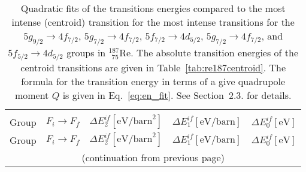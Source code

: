 \begin{longtable}{cc|rrr}
\caption{\label{tab:re187energ}%
Quadratic fits of the transitions energies compared to the most intense (centroid) transition for the most intense transitions for the $5g_{9/2}\rightarrow4f_{7/2}$, $5g_{7/2}\rightarrow4f_{7/2}$, $5f_{7/2}\rightarrow4d_{5/2}$, $5g_{7/2}\rightarrow4f_{7/2}$, and $5f_{5/2}\rightarrow4d_{5/2}$ groups in $^{187}_{\,\;75}$Re. The absolute transition energies of the centroid transitions are given in Table~\ref{tab:re187centroid}. The formula for the transition energy in terms of a give quadrupole moment $Q$ is given in Eq.~\eqref{eq:en_fit}. See Section~2.3. for details.}
\\\hline\\[-10pt]\hline\\[-10pt]
\centering
Group& $F_i \rightarrow F_f$ & $\Delta E_2^{if} [\text{eV/barn}^2]$ & $\Delta E_1^{if} [\text{eV/barn}]$ & $\Delta E_0^{if} [\text{eV}]$\\[1pt]\hline\endfirsthead

Group& $F_i \rightarrow F_f$ & $\Delta E_2^{if} [\text{eV/barn}^2]$ & $\Delta E_1^{if} [\text{eV/barn}]$ & $\Delta E_0^{if} [\text{eV}]$\\[1pt]\hline
\multicolumn{5}{c}{{(continuation from previous page)}}\\
\endhead


\end{longtable}
